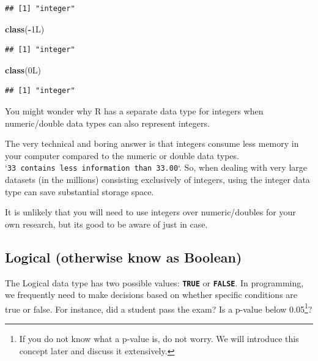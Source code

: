 \documentclass[
]{book}
\newenvironment{Shaded}{\begin{snugshade}}{\end{snugshade}}
\newcommand{\DataTypeTok}[1]{\textcolor[rgb]{0.13,0.29,0.53}{#1}}
\newcommand{\DecValTok}[1]{\textcolor[rgb]{0.00,0.00,0.81}{#1}}
\newcommand{\FunctionTok}[1]{\textcolor[rgb]{0.13,0.29,0.53}{\textbf{#1}}}
\newcommand{\NormalTok}[1]{#1}
\newcommand{\SpecialCharTok}[1]{\textcolor[rgb]{0.81,0.36,0.00}{\textbf{#1}}}
\begin{document}
\begin{verbatim}
## [1] "integer"
\end{verbatim}

\begin{Shaded}
\begin{Highlighting}[]
\FunctionTok{class}\NormalTok{(}\SpecialCharTok{{-}}\DecValTok{1}\DataTypeTok{L}\NormalTok{)}
\end{Highlighting}
\end{Shaded}

\begin{verbatim}
## [1] "integer"
\end{verbatim}

\begin{Shaded}
\begin{Highlighting}[]
\FunctionTok{class}\NormalTok{(}\DecValTok{0}\DataTypeTok{L}\NormalTok{)}
\end{Highlighting}
\end{Shaded}

\begin{verbatim}
## [1] "integer"
\end{verbatim}

You might wonder why R has a separate data type for integers when numeric/double data types can also represent integers.

The very technical and boring answer is that integers consume less memory in your computer compared to the numeric or double data types. `\texttt{33\ contains\ less\ information\ than\ 33.00}`. So, when dealing with very large datasets (in the millions) consisting exclusively of integers, using the integer data type can save substantial storage space.

It is unlikely that you will need to use integers over numeric/doubles for your own research, but its good to be aware of just in case.

\subsection{Logical (otherwise know as Boolean)}\label{logical-otherwise-know-as-boolean}

The Logical data type has two possible values: \textbf{\texttt{TRUE}} or \textbf{\texttt{FALSE}}. In programming, we frequently need to make decisions based on whether specific conditions are true or false. For instance, did a student pass the exam? Is a p-value below 0.05\footnote{If you do not know what a p-value is, do not worry. We will introduce this concept later and discuss it extensively.}?
\end{document}
